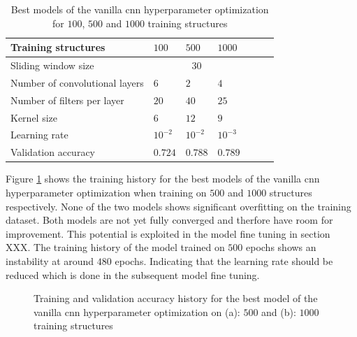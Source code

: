 \documentclass[conference]{IEEEtran}
\begin{document}
\begin{table}[htp]
	\centering
	\caption{Best models of the vanilla \gls{cnn} hyperparameter optimization for $ 100 $, $ 500 $ and $ 1000 $ training structures}
	\label{tab:hyperparameters_100_500_1000_structures_CNN}
	\begin{tabular}{p{2.5cm}|llllll}
		Training structures & $ 100 $ & $ 500 $ & $ 1000 $ \\
		\hline
		Sliding window size & \multicolumn{3}{c}{$ 30 $} \\
		\hline
		Number of convolutional layers & $ 6 $ & $ 2 $ & $ 4 $ \\
		Number of filters per layer & $ 20 $ & $ 40 $ & $ 25 $ \\
		Kernel size & $ 6 $ & $ 12 $ & $ 9 $ \\
		Learning rate & $ 10^{-2} $ & $ 10^{-2} $ & $ 10^{-3} $ \\
		\hline
		Validation accuracy & $ 0.724 $ & $ 0.788 $ & $ 0.789 $
	\end{tabular}
\end{table}

Figure \ref{fig:accuracy_500_1000_structures_random_search_CNN} shows the training history for the best models of the vanilla \gls{cnn} hyperparameter optimization when training on $ 500 $ and $ 1000 $ structures respectively. None of the two models shows significant overfitting on the training dataset. Both models are not yet fully converged and therfore have room for improvement. This potential is exploited in the model fine tuning in section XXX. The training history of the model trained on $ 500 $ epochs shows an instability at around $ 480 $ epochs. Indicating that the learning rate should be reduced which is done in the subsequent model fine tuning.

\begin{figure}[htp]
	\centering
	\quad
	\caption{Training and validation accuracy history for the best model of the vanilla \gls{cnn} hyperparameter optimization on (a): $ 500 $ and (b): $ 1000 $ training structures}
	\label{fig:accuracy_500_1000_structures_random_search_CNN}
\end{figure}
\end{document}
